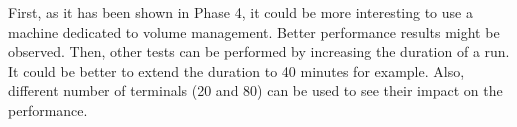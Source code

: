 First, as it has been shown in Phase 4, it could be more interesting to use a machine dedicated to volume management.
Better performance results might be observed.
Then, other tests can be performed by increasing the duration of a run. 
It could be better to extend the duration to 40 minutes for example.
Also, different number of terminals (20 and 80) can be used to see their impact on the performance.





